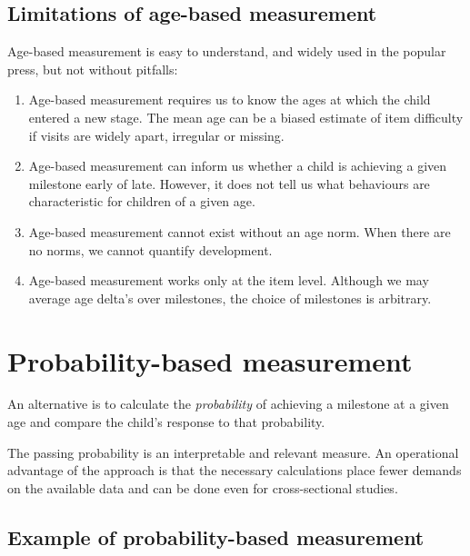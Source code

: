 \documentclass[
]{book}
\begin{document}
\hypertarget{limitations-of-age-based-measurement}{%
\subsection{Limitations of age-based measurement}\label{limitations-of-age-based-measurement}}

Age-based measurement is easy to understand, and widely used in the popular press, but not without pitfalls:

\begin{enumerate}
\def\labelenumi{\arabic{enumi}.}
\item
  Age-based measurement requires us to know the ages at which the child entered a new stage. The mean age can be a biased estimate of item difficulty if visits are widely apart, irregular or missing.
\item
  Age-based measurement can inform us whether a child is achieving a given milestone early of late. However, it does not tell us what behaviours are characteristic for children of a given age.
\item
  Age-based measurement cannot exist without an age norm. When there are no norms, we cannot quantify development.
\item
  Age-based measurement works only at the item level. Although we may average age delta's over milestones, the choice of milestones is arbitrary.
\end{enumerate}

\hypertarget{sec:probbased}{%
\section{Probability-based measurement}\label{sec:probbased}}

An alternative is to calculate the \emph{probability} of achieving a milestone at a given age and compare the child's response to that probability.

The passing probability is an interpretable and relevant measure. An operational advantage of the approach is that the necessary calculations place fewer demands on the available data and can be done even for cross-sectional studies.

\hypertarget{example-of-probability-based-measurement}{%
\subsection{Example of probability-based measurement}\label{example-of-probability-based-measurement}}
\end{document}
